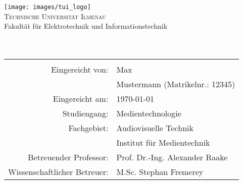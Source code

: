 %
%
%
%

\begin{titlepage}
	\centering
	\texttt{[image: images/tui\_logo]}\\[3ex]
	{\Large \textsc{Technische Universität Ilmenau}}\\[3ex]
	{\Large Fakultät für Elektrotechnik und Informationstechnik}\\[3ex]
	\vfill
	{\Large \textbf{\artderausarbeitung}}\\[4ex]
	{\large \textbf{\themaderarbeit}}\\[4ex]
	\vfill
	\begin{tabular}{rl}
		\hline\\
		Eingereicht von:          & \quad Max\\[1.5ex]
								  & \quad Mustermann (Matrikelnr.: 12345)\\[1,5ex]
		Eingereicht am:         & \quad \today\\[1,5ex]
		Studiengang:            & \quad Medientechnologie\\[1,5ex]
		Fachgebiet:
		& \quad Audiovisuelle Technik\\[1,5ex]
		& \quad Institut für Medientechnik\\[1,5ex]
		Betreuender Professor:
		& \quad Prof. Dr.-Ing. Alexander Raake \\[1,5ex]
		Wissenschaftlicher Betreuer:
		& \quad M.Sc. Stephan Fremerey
	\end{tabular}
	\vfill
\end{titlepage}

